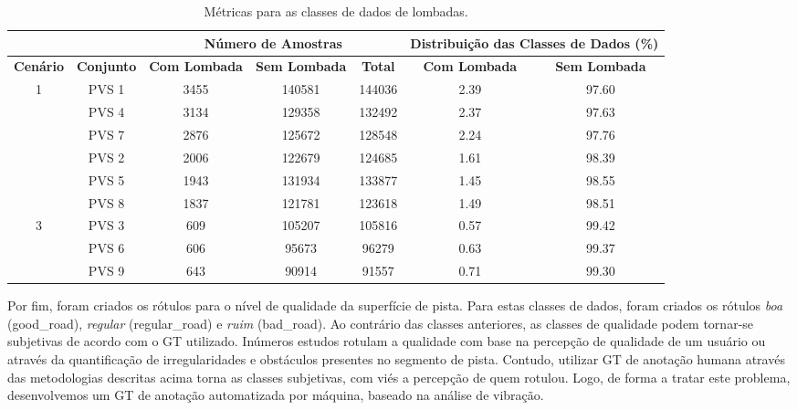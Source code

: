 \begin{table}[H]
\scriptsize
\centering
\caption{Métricas para as classes de dados de lombadas.} 
\label{table:lombada_metricas}
\begin{tabular}{ccccccc}
\cmidrule(l){3-7}
\multicolumn{1}{l}{} & 
\multicolumn{1}{l}{} & 
\multicolumn{3}{c}{\textbf{Número de Amostras}} & 
\multicolumn{2}{c}{\textbf{Distribuição das Classes de Dados (\%)}} \\ \midrule
\textbf{Cenário} & 
\textbf{Conjunto} & 
\textbf{Com Lombada} & 
\textbf{Sem Lombada} & 
\textbf{Total} & 
\textbf{Com Lombada} & 
\textbf{Sem Lombada} \\ \midrule

\multirow{4}{*}{1} & PVS 1 & 3455 & 140581 & 144036 & 2.39 & 97.60 \\ \cmidrule(l){2-7} 
 & PVS 4 & 3134 & 129358 & 132492 & 2.37 & 97.63 \\ \cmidrule(l){2-7} 
 & PVS 7 & 2876 & 125672 & 128548 & 2.24 & 97.76 \\ \midrule
 
\multirow{4}{*}{2} & PVS 2 & 2006 & 122679 & 124685 & 1.61 & 98.39 \\ \cmidrule(l){2-7} 
 & PVS 5 & 1943 & 131934 & 133877 & 1.45 & 98.55 \\ \cmidrule(l){2-7} 
 & PVS 8 & 1837 & 121781 & 123618 & 1.49 & 98.51 \\ \midrule
 
\multirow{4}{*}{3} & PVS 3 & 609 & 105207 & 105816 & 0.57 & 99.42 \\ \cmidrule(l){2-7} 
 & PVS 6 & 606 & 95673 & 96279 & 0.63 & 99.37 \\ \cmidrule(l){2-7} 
 & PVS 9 & 643 & 90914 & 91557 & 0.71 & 99.30 \\ \bottomrule
\end{tabular}
\end{table}

Por fim, foram criados os rótulos para o nível de qualidade da superfície de pista. Para estas classes de dados, foram criados os rótulos \emph{boa} (good\_road), \emph{regular} (regular\_road) e \emph{ruim} (bad\_road). Ao contrário das classes anteriores, as classes de qualidade podem tornar-se subjetivas de acordo com o GT utilizado. Inúmeros estudos rotulam a qualidade com base na percepção de qualidade de um usuário ou através da quantificação de irregularidades e obstáculos presentes no segmento de pista. Contudo, utilizar GT de anotação humana através das metodologias descritas acima torna as classes subjetivas, com viés a percepção de quem rotulou. Logo, de forma a tratar este problema, desenvolvemos um GT de anotação automatizada por máquina, baseado na análise de vibração.

